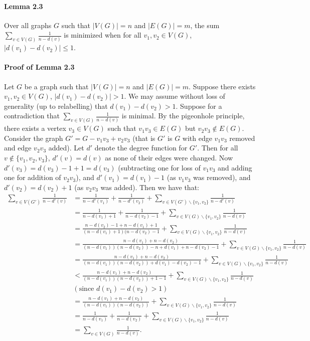 \documentclass[letterpaper,12pt,oneside,onecolumn]{article}
\begin{document}
\paragraph{Lemma 2.3}
Over all graphs $G$ such that $|V(G)| = n$ and $|E(G)|=m$, the sum $\sum_{v \in V(G)} \frac{1}{n-d(v)}$ is minimized when for all $v_1, v_2 \in V(G)$, $|d(v_1) - d(v_2)| \leq 1$.
\paragraph{Proof of Lemma 2.3}
Let $G$ be a graph such that $|V(G)| = n$ and $|E(G)|=m$. Suppose there exists $v_1, v_2 \in V(G)$, $|d(v_1) - d(v_2)| > 1$. We may assume without loss of generality (up to relabelling) that $d(v_1) - d(v_2) > 1$. Suppose for a contradiction that $\sum_{v \in V(G)} \frac{1}{n-d(v)}$ is minimal. By the pigeonhole principle, there exists a vertex $v_3 \in V(G)$ such that $v_1v_3 \in E(G)$ but $v_2v_3 \not\in E(G)$. Consider the graph $G' = G - v_1v_3 + v_2v_3$ (that is $G'$ is $G$ with edge $v_1v_3$ removed and edge $v_2v_3$ added). Let $d'$ denote the degree function for $G'$. Then for all $v \not\in \{v_1,v_2,v_3\}$, $d'(v) = d(v)$ as none of their edges were changed. Now $d'(v_3) = d(v_3) - 1 + 1 = d(v_3)$ (subtracting one for loss of $v_1v_3$ and adding one for addition of $v_2v_3$), and $d'(v_1) = d(v_1) - 1$ (as $v_1v_3$ was removed), and $d'(v_2) = d(v_2) + 1$ (as $v_2v_3$ was added). Then we have that:
\begin{align*}
\sum_{v \in V(G')} \frac{1}{n - d'(v)} &= \frac{1}{n - d'(v_1)} + \frac{1}{n-d'(v_2)} + \sum_{v\in V(G')\backslash \{v_1,v_2\}} \frac{1}{n - d'(v)} \\
&=  \frac{1}{n - d(v_1) + 1} + \frac{1}{n-d(v_2) - 1} + \sum_{v\in V(G)\backslash \{v_1,v_2\}} \frac{1}{n - d(v)} \\
&= \frac{n - d(v_2) -1 + n - d(v_1) + 1}{(n - d(v_1) + 1)(n-d(v_2) - 1} +  \sum_{v\in V(G)\backslash \{v_1,v_2\}} \frac{1}{n - d(v)} \\
&= \frac{n - d(v_1) + n - d(v_2)}{(n-d(v_1))(n-d(v_2)) - n + d(v_1) + n - d(v_2) - 1} +  \sum_{v\in V(G)\backslash \{v_1,v_2\}} \frac{1}{n - d(v)} \\
&=\frac{n - d(v_1) + n - d(v_2)}{(n-d(v_1))(n-d(v_2)) + d(v_1) - d(v_2) - 1} +  \sum_{v\in V(G)\backslash \{v_1,v_2\}} \frac{1}{n - d(v)} \\
&<\frac{n - d(v_1) + n - d(v_2)}{(n-d(v_1))(n-d(v_2)) + 1 - 1} +  \sum_{v\in V(G)\backslash \{v_1,v_2\}} \frac{1}{n - d(v)} \\&(\text{since $d(v_1) - d(v_2) > 1$})\\
&=\frac{n - d(v_1) + n - d(v_2)}{(n-d(v_1))(n-d(v_2))} +  \sum_{v\in V(G)\backslash \{v_1,v_2\}} \frac{1}{n - d(v)} \\
&=\frac{1}{n- d(v_1)} + \frac{1}{n-d(v_2)}  +  \sum_{v\in V(G)\backslash \{v_1,v_2\}} \frac{1}{n - d(v)} \\
&=\sum_{v\in V(G)} \frac{1}{n - d(v)}.
\end{align*}
\end{document}
